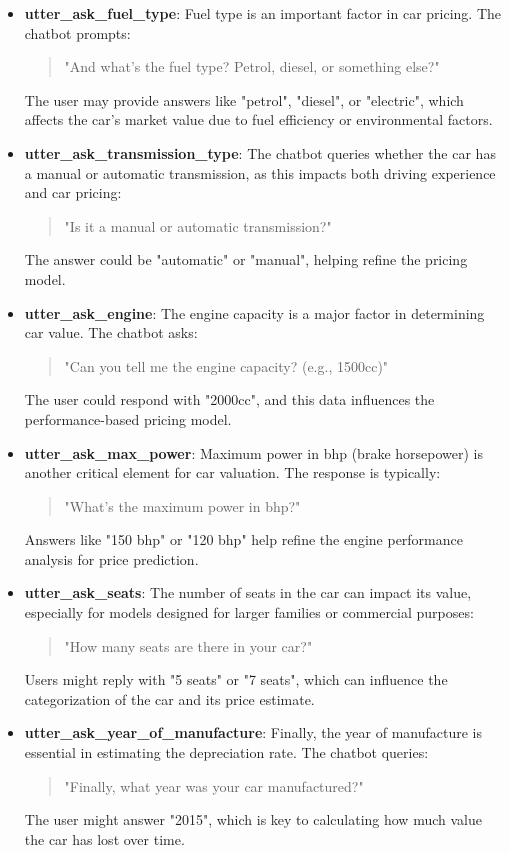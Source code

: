 \documentclass[a4paper,12pt]{article}
\begin{document}
\begin{itemize}
	\item \textbf{utter\_ask\_fuel\_type}: Fuel type is an important factor in car pricing. The chatbot prompts:
	\begin{quote}
		"And what’s the fuel type? Petrol, diesel, or something else?"
	\end{quote}
	The user may provide answers like "petrol", "diesel", or "electric", which affects the car's market value due to fuel efficiency or environmental factors.
	
	\item \textbf{utter\_ask\_transmission\_type}: The chatbot queries whether the car has a manual or automatic transmission, as this impacts both driving experience and car pricing:
	\begin{quote}
		"Is it a manual or automatic transmission?"
	\end{quote}
	The answer could be "automatic" or "manual", helping refine the pricing model.
	
	\item \textbf{utter\_ask\_engine}: The engine capacity is a major factor in determining car value. The chatbot asks:
	\begin{quote}
		"Can you tell me the engine capacity? (e.g., 1500cc)"
	\end{quote}
	The user could respond with "2000cc", and this data influences the performance-based pricing model.
	
	\item \textbf{utter\_ask\_max\_power}: Maximum power in bhp (brake horsepower) is another critical element for car valuation. The response is typically:
	\begin{quote}
		"What’s the maximum power in bhp?"
	\end{quote}
	Answers like "150 bhp" or "120 bhp" help refine the engine performance analysis for price prediction.
	
	\item \textbf{utter\_ask\_seats}: The number of seats in the car can impact its value, especially for models designed for larger families or commercial purposes:
	\begin{quote}
		"How many seats are there in your car?"
	\end{quote}
	Users might reply with "5 seats" or "7 seats", which can influence the categorization of the car and its price estimate.
	
	\item \textbf{utter\_ask\_year\_of\_manufacture}: Finally, the year of manufacture is essential in estimating the depreciation rate. The chatbot queries:
	\begin{quote}
		"Finally, what year was your car manufactured?"
	\end{quote}
	The user might answer "2015", which is key to calculating how much value the car has lost over time.
\end{itemize}
\end{document}
